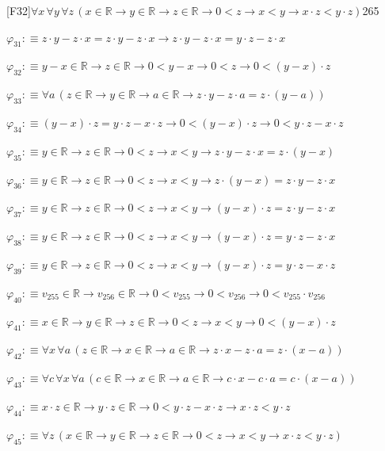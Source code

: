 \begin{fullproof}{[F32]}{$\forall x\,\forall y\,\forall z\,(x \in \mathbb{R} \to y \in \mathbb{R} \to z \in \mathbb{R} \to 0 < z \to x < y \to x \cdot z < y \cdot z)$}{265}
\begin{abbrevlist}
\item $\varphi_{31} :\equiv z \cdot y - z \cdot x = z \cdot y - z \cdot x \to z \cdot y - z \cdot x = y \cdot z - z \cdot x$
\item $\varphi_{32} :\equiv y - x \in \mathbb{R} \to z \in \mathbb{R} \to 0 < y - x \to 0 < z \to 0 < (y - x) \cdot z$
\item $\varphi_{33} :\equiv \forall a\,(z \in \mathbb{R} \to y \in \mathbb{R} \to a \in \mathbb{R} \to z \cdot y - z \cdot a = z \cdot (y - a))$
\item $\varphi_{34} :\equiv (y - x) \cdot z = y \cdot z - x \cdot z \to 0 < (y - x) \cdot z \to 0 < y \cdot z - x \cdot z$
\item $\varphi_{35} :\equiv y \in \mathbb{R} \to z \in \mathbb{R} \to 0 < z \to x < y \to z \cdot y - z \cdot x = z \cdot (y - x)$
\item $\varphi_{36} :\equiv y \in \mathbb{R} \to z \in \mathbb{R} \to 0 < z \to x < y \to z \cdot (y - x) = z \cdot y - z \cdot x$
\item $\varphi_{37} :\equiv y \in \mathbb{R} \to z \in \mathbb{R} \to 0 < z \to x < y \to (y - x) \cdot z = z \cdot y - z \cdot x$
\item $\varphi_{38} :\equiv y \in \mathbb{R} \to z \in \mathbb{R} \to 0 < z \to x < y \to (y - x) \cdot z = y \cdot z - z \cdot x$
\item $\varphi_{39} :\equiv y \in \mathbb{R} \to z \in \mathbb{R} \to 0 < z \to x < y \to (y - x) \cdot z = y \cdot z - x \cdot z$
\item $\varphi_{40} :\equiv v_{255} \in \mathbb{R} \to v_{256} \in \mathbb{R} \to 0 < v_{255} \to 0 < v_{256} \to 0 < v_{255} \cdot v_{256}$
\item $\varphi_{41} :\equiv x \in \mathbb{R} \to y \in \mathbb{R} \to z \in \mathbb{R} \to 0 < z \to x < y \to 0 < (y - x) \cdot z$
\item $\varphi_{42} :\equiv \forall x\,\forall a\,(z \in \mathbb{R} \to x \in \mathbb{R} \to a \in \mathbb{R} \to z \cdot x - z \cdot a = z \cdot (x - a))$
\item $\varphi_{43} :\equiv \forall c\,\forall x\,\forall a\,(c \in \mathbb{R} \to x \in \mathbb{R} \to a \in \mathbb{R} \to c \cdot x - c \cdot a = c \cdot (x - a))$
\item $\varphi_{44} :\equiv x \cdot z \in \mathbb{R} \to y \cdot z \in \mathbb{R} \to 0 < y \cdot z - x \cdot z \to x \cdot z < y \cdot z$
\item $\varphi_{45} :\equiv \forall z\,(x \in \mathbb{R} \to y \in \mathbb{R} \to z \in \mathbb{R} \to 0 < z \to x < y \to x \cdot z < y \cdot z)$

\end{abbrevlist}
\end{fullproof}
